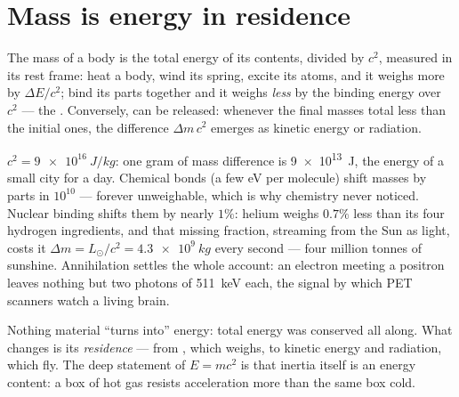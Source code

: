 \section{Mass is energy in residence}

\begin{theorem}\label{thm:b3:relativistic-dynamics:emc2}
The mass of a body is the total energy of its contents, divided by
$c^2$, measured in its rest frame: heat a body, wind its spring,
excite its atoms, and it weighs more by $\Delta E/c^2$; bind its parts
together and it weighs \emph{less} by the binding energy over $c^2$
--- the \emph{}. Conversely,  can be released:
whenever the final masses total less than the initial ones, the
difference $\Delta m\,c^2$ emerges as kinetic energy or radiation.
\end{theorem}
\admitted

\begin{example}\label{ex:b3:relativistic-dynamics:ledger}
$c^2 = \qty{9e16}{J/kg}$: one gram of mass difference is
\qty{9e13}{J}, the energy of a small city for a day. Chemical bonds
(a few eV per molecule) shift masses by parts in $10^{10}$ ---
forever unweighable, which is why chemistry never noticed. Nuclear
binding shifts them by nearly $1\%$: helium weighs $0.7\%$ less than
its four hydrogen ingredients, and that missing fraction, streaming
from the Sun as light, costs it $\Delta m = L_\odot/c^2 =
\qty{4.3e9}{kg}$ every second --- four million tonnes of sunshine.
Annihilation settles the whole account: an electron meeting a
positron leaves nothing but two photons of \qty{511}{keV} each, the
signal by which PET scanners watch a living brain.
\end{example}

\begin{remark}\label{rem:b3:relativistic-dynamics:conversion}
Nothing material ``turns into'' energy: total energy was conserved all
along. What changes is its \emph{residence} --- from ,
which weighs, to kinetic energy and radiation, which fly. The deep
statement of $E = mc^2$ is that inertia itself is an energy content:
a box of hot gas resists acceleration more than the same box cold.
\end{remark}

